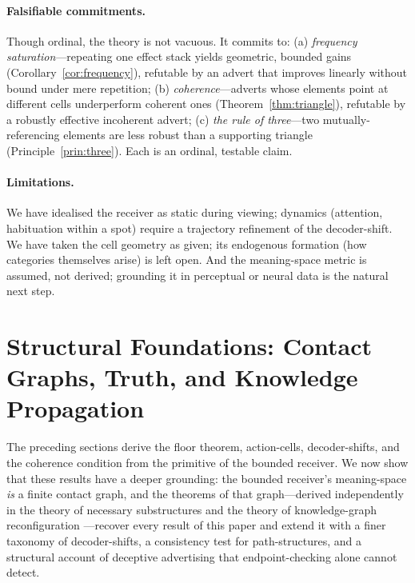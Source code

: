 \documentclass[twocolumn,11pt,a4paper]{article}
\theoremstyle{adv}
\theoremstyle{definition}
\theoremstyle{remark}
\begin{document}
\paragraph{Falsifiable commitments.}
Though ordinal, the theory is not vacuous. It commits to:
(a) \emph{frequency saturation}---repeating one effect stack yields
geometric, bounded gains (Corollary~\ref{cor:frequency}), refutable by an
advert that improves linearly without bound under mere repetition;
(b) \emph{coherence}---adverts whose elements point at different cells
underperform coherent ones (Theorem~\ref{thm:triangle}), refutable by a
robustly effective incoherent advert; (c) \emph{the rule of three}---two
mutually-referencing elements are less robust than a supporting triangle
(Principle~\ref{prin:three}). Each is an ordinal, testable claim.

\paragraph{Limitations.}
We have idealised the receiver as static during viewing; dynamics
(attention, habituation within a spot) require a trajectory refinement of
the decoder-shift. We have taken the cell geometry as given; its
endogenous formation (how categories themselves arise) is left open. And
the meaning-space metric is assumed, not derived; grounding it in
perceptual or neural data is the natural next step.

\section{Structural Foundations: Contact Graphs, Truth, and Knowledge Propagation}
\label{sec:foundations}

The preceding sections derive the floor theorem, action-cells, decoder-shifts,
and the coherence condition from the primitive of the bounded receiver. We now
show that these results have a deeper grounding: the bounded receiver's
meaning-space \emph{is} a finite contact graph, and the theorems of that
graph---derived independently in the theory of necessary substructures
\citep{sachikonye2025contact} and the theory of knowledge-graph reconfiguration
\citep{sachikonye2025knowledge}---recover every result of this paper and extend
it with a finer taxonomy of decoder-shifts, a consistency test for
path-structures, and a structural account of deceptive advertising that
endpoint-checking alone cannot detect.
\end{document}
